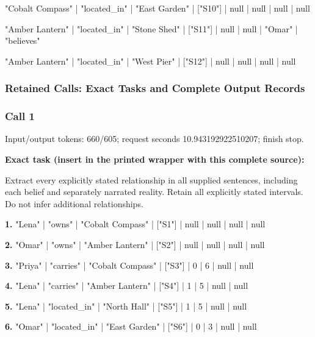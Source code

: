 "Cobalt Compass" | "located\_in" | "East Garden" | ["S10"] | null | null | null | null\par\smallskip

"Amber Lantern" | "located\_in" | "Stone Shed" | ["S11"] | null | null | "Omar" | "believes"\par\smallskip

"Amber Lantern" | "located\_in" | "West Pier" | ["S12"] | null | null | null | null\par\smallskip

\subsubsection*{Retained Calls: Exact Tasks and Complete Output Records}

\subsubsection*{Call 1}

Input/output tokens: 660/605; request seconds 10.943192922510207; finish stop.

\noindent\textbf{Exact task (insert in the printed wrapper with this complete source):}\par Extract every explicitly stated relationship in all supplied sentences, including each belief and separately narrated reality. Retain all explicitly stated intervals. Do not infer additional relationships.

\noindent\textbf{1.} "Lena" | "owns" | "Cobalt Compass" | ["S1"] | null | null | null | null\par\smallskip

\noindent\textbf{2.} "Omar" | "owns" | "Amber Lantern" | ["S2"] | null | null | null | null\par\smallskip

\noindent\textbf{3.} "Priya" | "carries" | "Cobalt Compass" | ["S3"] | 0 | 6 | null | null\par\smallskip

\noindent\textbf{4.} "Lena" | "carries" | "Amber Lantern" | ["S4"] | 1 | 5 | null | null\par\smallskip

\noindent\textbf{5.} "Lena" | "located\_in" | "North Hall" | ["S5"] | 1 | 5 | null | null\par\smallskip

\noindent\textbf{6.} "Omar" | "located\_in" | "East Garden" | ["S6"] | 0 | 3 | null | null\par\smallskip

